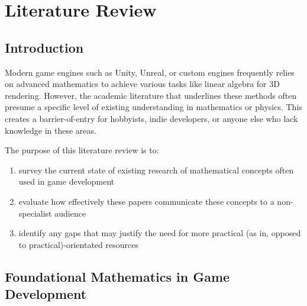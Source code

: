 \chapter{Literature Review}

\section{Introduction}

Modern game engines such as Unity, Unreal, or custom engines frequently relies on advanced mathematics to achieve various tasks like linear algebra for 3D rendering. However, the academic literature that
underlines these methods often presume a specific level of existing understanding in mathematics or physics. This creates a barrier-of-entry for hobbyists, indie developers, or anyone else who
lack knowledge in these areas.

The purpose of this literature review is to:
    \begin{enumerate}[label=(\roman*)]
        \item survey the current state of existing research of mathematical concepts often used in game development
        \item evaluate how effectively these papers communicate these concepts to a non-specialist audience
        \item identify any gaps that may justify the need for more practical (as in, opposed to practical)-orientated resources
    \end{enumerate}

\break

\section{Foundational Mathematics in Game Development}

